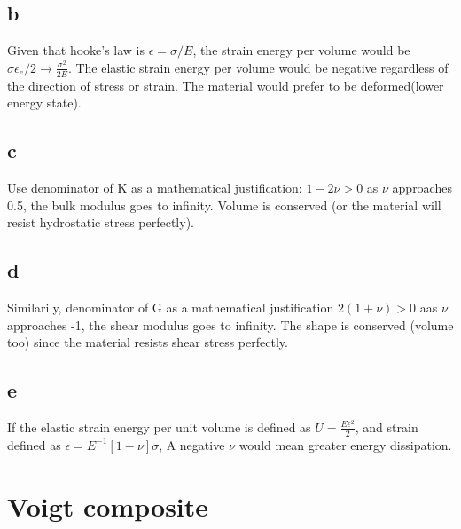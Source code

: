 \documentclass[11pt]{article}
\begin{document}
\subsection{b}
Given that hooke's law is $\epsilon = \sigma/E$, the strain energy per volume would be $\sigma \epsilon_e / 2 \rightarrow \frac{\sigma^2}{2E}$. The elastic strain energy per volume would be negative regardless of the direction of stress or strain. The material would prefer to be deformed(lower energy state).
\subsection{c}
Use denominator of K as a mathematical justification: $1-2\nu > 0$ as $\nu$ approaches 0.5, the bulk modulus goes to infinity. Volume is conserved (or the material will resist hydrostatic stress perfectly).
\subsection{d}
Similarily, denominator of G as a mathematical justification $2(1+\nu) > 0$ aas $\nu$ approaches -1, the shear modulus goes to infinity. The shape is conserved (volume too) since the material resists shear stress perfectly.
\subsection{e}
If the elastic strain energy per unit volume is defined as $U = \frac{E\epsilon^2}{2}$, and strain defined as $\epsilon = E^{-1}[1-\nu]\sigma$, A negative $\nu$ would mean greater energy dissipation.
\section{Voigt composite}
\end{document}
